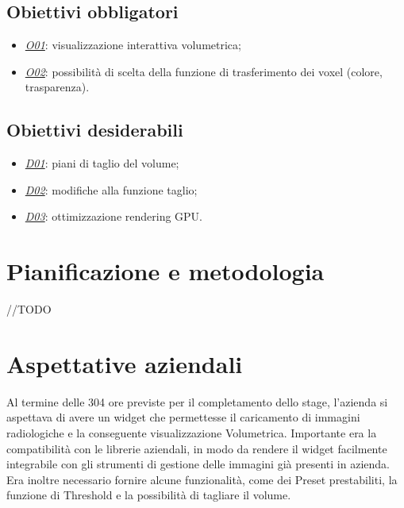 \subsection{Obiettivi obbligatori}\label{sec:obiettivi-obbligatori}
\begin{itemize}
\item \underline{\textit{O01}}: visualizzazione interattiva volumetrica;
\item \underline{\textit{O02}}: possibilità di scelta della funzione di trasferimento dei voxel (colore, trasparenza).
\end{itemize}

\subsection{Obiettivi desiderabili}\label{sec:obiettivi-desiderabili}
\begin{itemize}
\item \underline{\textit{D01}}: piani di taglio del volume;
\item \underline{\textit{D02}}: modifiche alla funzione taglio;
\item \underline{\textit{D03}}: ottimizzazione rendering GPU.
\end{itemize}

\section{Pianificazione e metodologia}
//TODO
\section{Aspettative aziendali}
Al termine delle 304 ore previste per il completamento dello stage, l’azienda si aspettava di avere un widget che permettesse il caricamento di immagini radiologiche e la conseguente visualizzazione Volumetrica. Importante era la compatibilità con le librerie aziendali, in modo da rendere il widget facilmente integrabile con gli strumenti di gestione delle immagini già presenti in azienda.\\
Era inoltre necessario fornire alcune funzionalità, come dei Preset prestabiliti, la funzione di Threshold e la possibilità di tagliare il volume.

